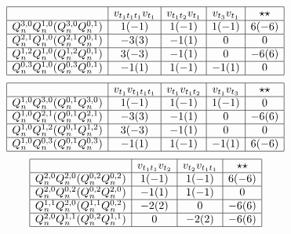 \documentclass[11p,reqno]{amsart}
\numberwithin{equation}{section}
\numberwithin{equation}{section}
\begin{document}
\begin{align*}
    \begin{array}{|c|c|c|c|c|}
        \hline
         & v_{t_1t_1t_1} v_{t_1} & v_{t_1t_2} v_{t_1} & v_{t_3} v_{t_1} & \star\star \\ \hline
        Q_n^{3, 0}Q_n^{1, 0}(Q_n^{3, 0}Q_n^{0, 1}) & 1(-1) & 1(-1) & 1(-1) & 6(-6) \\ \hline
        Q_n^{2, 1}Q_n^{1, 0}(Q_n^{2, 1}Q_n^{0, 1}) & -3(3) & -1(1) & 0 & 0 \\ \hline
        Q_n^{1, 2}Q_n^{1, 0}(Q_n^{1, 2}Q_n^{0, 1}) & 3(-3) & -1(1) & 0 & -6(6) \\ \hline
        Q_n^{0, 3}Q_n^{1, 0}(Q_n^{0, 3}Q_n^{0, 1}) & -1(1) & 1(-1) & -1(1) & 0 \\ \hline
    \end{array}
\end{align*}
\begin{align*}
    \begin{array}{|c|c|c|c|c|}
        \hline
         & v_{t_1} v_{t_1t_1t_1} & v_{t_1} v_{t_1t_2} & v_{t_1} v_{t_3} & \star\star \\ \hline
        Q_n^{1, 0}Q_n^{3, 0}(Q_n^{0, 1}Q_n^{3, 0}) & 1(-1) & 1(-1) & 1(-1) & 0 \\ \hline
        Q_n^{1, 0}Q_n^{2, 1}(Q_n^{0, 1}Q_n^{2, 1}) & -3(3) & -1(1) & 0 & -6(6) \\ \hline
        Q_n^{1, 0}Q_n^{1, 2}(Q_n^{0, 1}Q_n^{1, 2}) & 3(-3) & -1(1) & 0 & 0 \\ \hline
        Q_n^{1, 0}Q_n^{0, 3}(Q_n^{0, 1}Q_n^{0, 3}) & -1(1) & 1(-1) & -1(1) & 6(-6) \\ \hline
    \end{array} 
\end{align*}
\begin{align*}
    \begin{array}{|c|c|c|c|c|}
        \hline
         & v_{t_1t_1} v_{t_2} & v_{t_2} v_{t_1t_1} & \star\star \\ \hline
        Q_n^{2, 0}Q_n^{2, 0}(Q_n^{0, 2}Q_n^{0, 2}) & 1(-1) & 1(-1) & 6(-6) \\ \hline
        Q_n^{2, 0}Q_n^{0, 2}(Q_n^{0, 2}Q_n^{2, 0}) & -1(1) & 1(-1) & 0 \\ \hline
        Q_n^{1, 1}Q_n^{2, 0}(Q_n^{1, 1}Q_n^{0, 2}) & -2(2) & 0 & -6(6) \\ \hline
        Q_n^{2, 0}Q_n^{1, 1}(Q_n^{0, 2}Q_n^{1, 1}) & 0 & -2(2) & -6(6) \\ \hline
    \end{array}
\end{align*}
\end{document}
